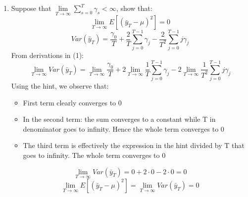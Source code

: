 \documentclass[10pt]{article}
\begin{document}
\begin{enumerate}
			\item
			Suppose that $\lim\limits_{T\to\infty} \sum\limits_{s=0}^{T} \gamma_s < \infty$, show that:
			\[
			\lim\limits_{T\to\infty} E[(\bar{y}_T - \mu)^2] = 0
			\]
			\[
			Var(\bar{y}_T) = \frac{\gamma_0}{T} + \frac{2}{T} \sum\limits_{j=0}^{T-1} \gamma_j - \frac{2}{T^2} \sum\limits_{j=0}^{T-1} j\gamma_j
			\]
			From derivations in (1):
			\[
			\lim\limits_{T\to\infty} Var(\bar{y}_T) = \lim\limits_{T\to\infty} \frac{\gamma_0}{T} + 2 \lim\limits_{T\to\infty} \frac{1}{T} \sum\limits_{j=0}^{T-1} \gamma_j - 2 \lim\limits_{T\to\infty} \frac{1}{T^2} \sum\limits_{j=0}^{T-1} j\gamma_j
			\]
			Using the hint, we observe that:
			\begin{itemize}
				\item First term clearly converges to 0
				\item In the second term: the sum converges to a constant while T in denominator goes to infinity. Hence the whole term converges to 0
				\item The third term is effectively the expression in the hint divided by T that goes to infinity. The whole term converges to 0
			\end{itemize}
			\[
			\lim\limits_{T\to\infty} Var(\bar{y}_T) = 0 + 2 \cdot 0 - 2 \cdot 0 = 0
			\]
			\[
			\lim\limits_{T\to\infty} E[(\bar{y}_T - \mu)^2] = \lim\limits_{T\to\infty} Var(\bar{y}_T) = 0
			\]
		\end{enumerate}
		
\end{document}

